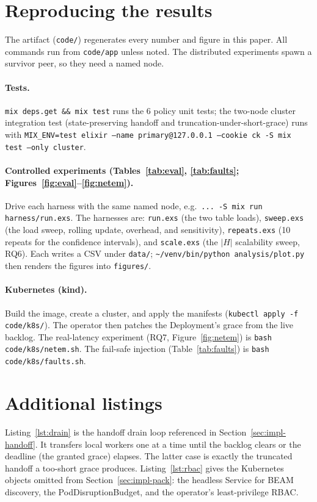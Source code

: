 \documentclass[AMA,Times1COL]{WileyNJDv5}
\begin{document}
\appendix

\section{Reproducing the results}\label{app:repro}
The artifact (\texttt{code/}) regenerates every number and figure in this paper. All commands run from
\texttt{code/app} unless noted. The distributed experiments spawn a survivor peer, so they need a
named node.

\paragraph{Tests.} \texttt{mix deps.get \&\& mix test} runs the 6 policy unit tests; the two-node
cluster integration test (state-preserving handoff and truncation-under-short-grace) runs with
\texttt{MIX\_ENV=test elixir --name primary@127.0.0.1 --cookie ck -S mix test --only cluster}.

\paragraph{Controlled experiments (Tables~\ref{tab:eval}, \ref{tab:faults}; Figures~\ref{fig:eval}--\ref{fig:netem}).}
Drive each harness with the same named node, e.g.\
\texttt{... -S mix run harness/run.exs}. The harnesses are: \texttt{run.exs} (the two table loads),
\texttt{sweep.exs} (the load sweep, rolling update, overhead, and sensitivity), \texttt{repeats.exs}
(10 repeats for the confidence intervals), and \texttt{scale.exs} (the $|H|$ scalability sweep, RQ6).
Each writes a CSV under \texttt{data/}; \texttt{\textasciitilde/venv/bin/python analysis/plot.py} then
renders the figures into \texttt{figures/}.

\paragraph{Kubernetes (kind).} Build the image, create a cluster, and apply the manifests
(\texttt{kubectl apply -f code/k8s/}). The operator then patches the Deployment's grace from the live
backlog. The real-latency experiment (RQ7, Figure~\ref{fig:netem}) is \texttt{bash code/k8s/netem.sh}.
The fail-safe injection (Table~\ref{tab:faults}) is \texttt{bash code/k8s/faults.sh}.

\section{Additional listings}\label{app:manifests}
Listing~\ref{lst:drain} is the handoff drain loop referenced in Section~\ref{sec:impl-handoff}. It
transfers local workers one at a time until the backlog clears or the deadline (the granted grace)
elapses. The latter case is exactly the truncated handoff a too-short grace produces.
Listing~\ref{lst:rbac} gives the Kubernetes objects omitted from Section~\ref{sec:impl-pack}: the
headless Service for BEAM discovery, the PodDisruptionBudget, and the operator's least-privilege RBAC.
\end{document}
